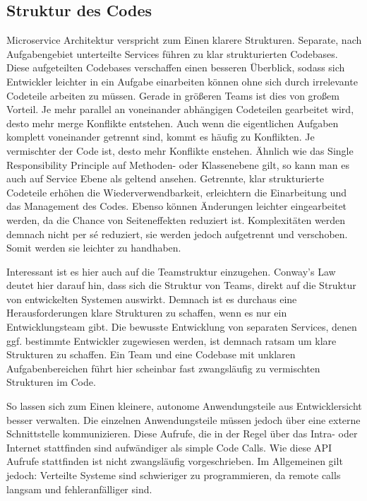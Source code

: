 \subsection{Struktur des Codes}
Microservice Architektur verspricht zum Einen klarere Strukturen. Separate, nach Aufgabengebiet unterteilte Services führen zu klar strukturierten Codebases. Diese aufgeteilten Codebases verschaffen einen besseren Überblick, sodass sich Entwickler leichter in ein Aufgabe einarbeiten können ohne sich durch irrelevante Codeteile arbeiten zu müssen. Gerade in größeren Teams ist dies von großem Vorteil. Je mehr parallel an voneinander abhängigen Codeteilen gearbeitet wird, desto mehr merge Konflikte entstehen. Auch wenn die eigentlichen Aufgaben komplett voneinander getrennt sind, kommt es häufig zu Konflikten. Je vermischter der Code ist, desto mehr Konflikte enstehen. Ähnlich wie das Single Responsibility Principle auf Methoden- oder Klassenebene gilt, so kann man es auch auf Service Ebene als geltend ansehen. Getrennte, klar strukturierte Codeteile erhöhen die Wiederverwendbarkeit, erleichtern die Einarbeitung und das Management des Codes. Ebenso können Änderungen leichter eingearbeitet werden, da die Chance von Seiteneffekten reduziert ist. Komplexitäten werden demnach nicht per sé reduziert, sie werden jedoch aufgetrennt und verschoben. Somit werden sie leichter zu handhaben.

Interessant ist es hier auch auf die Teamstruktur einzugehen. Conway's Law\cite{conwayslaw} deutet hier darauf hin, dass sich die Struktur von Teams, direkt auf die Struktur von entwickelten Systemen auswirkt. Demnach ist es durchaus eine Herausforderungen klare Strukturen zu schaffen, wenn es nur ein Entwicklungsteam gibt. Die bewusste Entwicklung von separaten Services, denen ggf. bestimmte Entwickler zugewiesen werden, ist demnach ratsam um klare Strukturen zu schaffen. Ein Team und eine Codebase mit unklaren Aufgabenbereichen führt hier scheinbar fast zwangsläufig zu vermischten Strukturen im Code.

So lassen sich zum Einen kleinere, autonome Anwendungsteile aus Entwicklersicht besser verwalten. Die einzelnen Anwendungsteile müssen jedoch über eine externe Schnittstelle kommunizieren. Diese Aufrufe, die in der Regel über das Intra- oder Internet stattfinden sind aufwändiger als simple Code Calls. Wie diese API Aufrufe stattfinden ist nicht zwangsläufig vorgeschrieben. Im Allgemeinen gilt jedoch: Verteilte Systeme sind schwieriger zu programmieren, da remote calls langsam und fehleranfälliger sind.~\cite[vgl.][]{Fowler:Guide}

